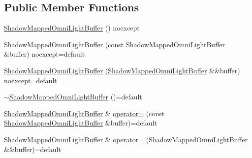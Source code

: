 \subsection*{Public Member Functions}
\begin{DoxyCompactItemize}
\item 
\mbox{\hyperlink{structmage_1_1rendering_1_1_shadow_mapped_omni_light_buffer_a3b9f6ffd582185ea739410aeeec8a446}{Shadow\+Mapped\+Omni\+Light\+Buffer}} () noexcept
\item 
\mbox{\hyperlink{structmage_1_1rendering_1_1_shadow_mapped_omni_light_buffer_a42ed551f04a7c53200e68e45c5ab9be5}{Shadow\+Mapped\+Omni\+Light\+Buffer}} (const \mbox{\hyperlink{structmage_1_1rendering_1_1_shadow_mapped_omni_light_buffer}{Shadow\+Mapped\+Omni\+Light\+Buffer}} \&buffer) noexcept=default
\item 
\mbox{\hyperlink{structmage_1_1rendering_1_1_shadow_mapped_omni_light_buffer_a7fb986d0697bdea8ac54f45c188f2a4b}{Shadow\+Mapped\+Omni\+Light\+Buffer}} (\mbox{\hyperlink{structmage_1_1rendering_1_1_shadow_mapped_omni_light_buffer}{Shadow\+Mapped\+Omni\+Light\+Buffer}} \&\&buffer) noexcept=default
\item 
\mbox{\hyperlink{structmage_1_1rendering_1_1_shadow_mapped_omni_light_buffer_afd9afa7796bbca38082cc8364f7c474c}{$\sim$\+Shadow\+Mapped\+Omni\+Light\+Buffer}} ()=default
\item 
\mbox{\hyperlink{structmage_1_1rendering_1_1_shadow_mapped_omni_light_buffer}{Shadow\+Mapped\+Omni\+Light\+Buffer}} \& \mbox{\hyperlink{structmage_1_1rendering_1_1_shadow_mapped_omni_light_buffer_ae43119f667592aea06f73532a9c9b742}{operator=}} (const \mbox{\hyperlink{structmage_1_1rendering_1_1_shadow_mapped_omni_light_buffer}{Shadow\+Mapped\+Omni\+Light\+Buffer}} \&buffer)=default
\item 
\mbox{\hyperlink{structmage_1_1rendering_1_1_shadow_mapped_omni_light_buffer}{Shadow\+Mapped\+Omni\+Light\+Buffer}} \& \mbox{\hyperlink{structmage_1_1rendering_1_1_shadow_mapped_omni_light_buffer_a5605852385a384c28a4c0cee6bc3cc32}{operator=}} (\mbox{\hyperlink{structmage_1_1rendering_1_1_shadow_mapped_omni_light_buffer}{Shadow\+Mapped\+Omni\+Light\+Buffer}} \&\&buffer)=default
\end{DoxyCompactItemize}
